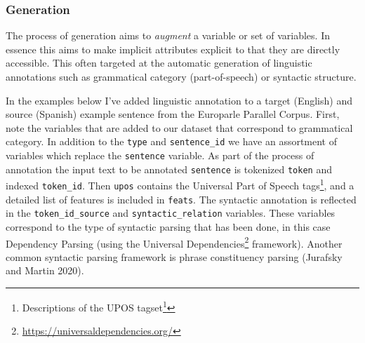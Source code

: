 \documentclass[
  letterpaper,
]{latex/krantz}
\DeclareRobustCommand{\href}[2]{#2\footnote{\url{#1}}}
\begin{document}
\hypertarget{generation}{%
\subsubsection{Generation}\label{generation}}

The process of generation aims to \emph{augment} a variable or set of
variables. In essence this aims to make implicit attributes explicit to
that they are directly accessible. This often targeted at the automatic
generation of linguistic annotations such as grammatical category
(part-of-speech) or syntactic structure.

In the examples below I've added linguistic annotation to a target
(English) and source (Spanish) example sentence from the Europarle
Parallel Corpus. First, note the variables that are added to our dataset
that correspond to grammatical category. In addition to the
\texttt{type} and \texttt{sentence\_id} we have an assortment of
variables which replace the \texttt{sentence} variable. As part of the
process of annotation the input text to be annotated \texttt{sentence}
is tokenized \texttt{token} and indexed \texttt{token\_id}. Then
\texttt{upos} contains the Universal Part of Speech tags\footnote{\href{https://universaldependencies.org/u/pos/}{Descriptions
  of the UPOS tagset}}, and a detailed list of features is included in
\texttt{feats}. The syntactic annotation is reflected in the
\texttt{token\_id\_source} and \texttt{syntactic\_relation} variables.
These variables correspond to the type of syntactic parsing that has
been done, in this case Dependency Parsing (using the
\href{https://universaldependencies.org/}{Universal Dependencies}
framework). Another common syntactic parsing framework is phrase
constituency parsing (Jurafsky and Martin 2020).
\end{document}

